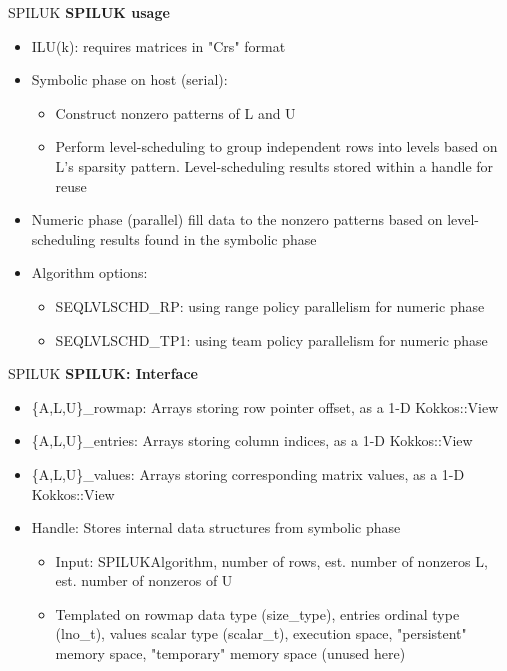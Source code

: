 \begin{frame}[fragile]{SPILUK}
\textbf{SPILUK usage}

  \begin{itemize}
    \item ILU(k): requires matrices in "Crs" format
    \item Symbolic phase on host (serial):
    \begin{itemize}
      \item Construct nonzero patterns of L and U
      \item Perform level-scheduling to group independent rows into levels based on L's sparsity pattern. Level-scheduling results stored within a handle for reuse
    \end{itemize}
    \item Numeric phase (parallel) fill data to the nonzero patterns based on level-scheduling results found in the symbolic phase
    \item Algorithm options:
    \begin{itemize}
      \item SEQLVLSCHD\_RP: using range policy parallelism for numeric phase
      \item SEQLVLSCHD\_TP1: using team policy parallelism for numeric phase
    \end{itemize}
  \end{itemize}

\end{frame}

\begin{frame}[fragile]{SPILUK}
\textbf{SPILUK: Interface}

  \begin{itemize}
    \item \{A,L,U\}\_rowmap: Arrays storing row pointer offset, as a 1-D Kokkos::View
    \item \{A,L,U\}\_entries: Arrays storing column indices, as a 1-D Kokkos::View
    \item \{A,L,U\}\_values: Arrays storing corresponding matrix values, as a 1-D Kokkos::View
    \item Handle: Stores internal data structures from symbolic phase
    \begin{itemize}
      \item Input: SPILUKAlgorithm, number of rows, est. number of nonzeros L, est. number of nonzeros of U
      \item Templated on rowmap data type (size\_type), entries ordinal type (lno\_t), values scalar type (scalar\_t), execution space, "persistent" memory space, "temporary" memory space (unused here)
    \end{itemize}
  \end{itemize}

\end{frame}

